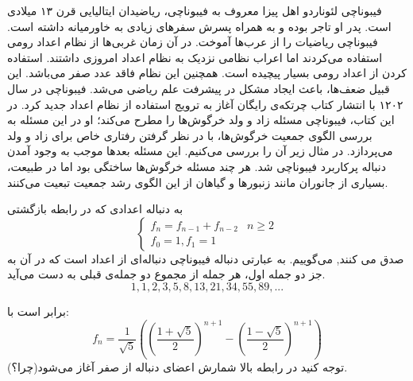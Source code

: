 \begin{EXTRA}{ فیبوناچی }
\p
{}
\p
لئوناردو اهل پیزا
معروف به
فیبوناچی،
 ریاضیدان ایتالیایی قرن 
۱۳
میلادی
است.
پدر او تاجر بوده و به همراه پسرش سفرهای زیادی به خاورمیانه داشته است.
فیبوناچی ریاضیات را از عرب‌ها آموخت.
در آن زمان غربی‌ها از نظام اعداد رومی استفاده می‌کردند اما اعراب نظامی نزدیک به نظام اعداد امروزی داشتند.
استفاده کردن از اعداد رومی بسیار پیچیده‌ است. همچنین این نظام فاقد عدد صفر می‌باشد. این قبیل ضعف‌ها، باعث ایجاد مشکل در پیشرفت علم ریاضی می‌شد.
فیبوناچی در سال ۱۲۰۲ با انتشار کتاب
چرتکه‌ی رایگان
آغاز به
ترویج استفاده از نظام اعداد جدید کرد.
در این کتاب، فیبوناچی مسئله زاد و ولد خرگوش‌ها را مطرح می‌کند؛ او در این مسئله به بررسی الگوی جمعیت خرگوش‌ها، با در نظر گرفتن رفتاری خاص برای زاد و ولد می‌پردازد. در مثال زیر آن را بررسی می‌کنیم.
این مسئله بعدها  موجب به وجود آمدن دنباله پرکاربرد فیبوناچی شد.
هر چند مسئله خرگوش‌ها ساختگی بود اما در طبیعت، بسیاری از جانوران مانند زنبورها و گیاهان از این الگوی رشد جمعیت تبعیت می‌کنند.
\end{EXTRA}



\begin{DEFINITION}
  \p
    به دنباله اعدادی که در رابطه بازگشتی
  \[\begin{cases}
      f_{n}=f_{n-1} + f_{n-2} & n\geq 2 \\
      
      f_0=1 ,
      f_1 = 1
  \end{cases}
  \]
  صدق می کنند,
    می‌گوییم.
    به عبارتی دنباله فیبوناچی
    دنباله‌ای از اعداد است که در آن به جز دو جمله اول، هر جمله از مجموع دو جمله‌ی قبلی به دست می‌آید.
    \p
  $$1, 1, 2, 3, 5, 8, 13, 21, 34, 55, 89, ...$$
\end{DEFINITION}





\begin{THEOREM}
    \p
    برابر است با:
    $$f_n = \frac{1}{\sqrt{5}}((\frac{1 + \sqrt{5}}{2})^{n+1} - (\frac{1 - \sqrt{5}}{2})^{n+1})$$
    توجه کنید در رابطه بالا شمارش اعضای دنباله از صفر آغاز می‌شود(چرا؟).
\end{THEOREM}



